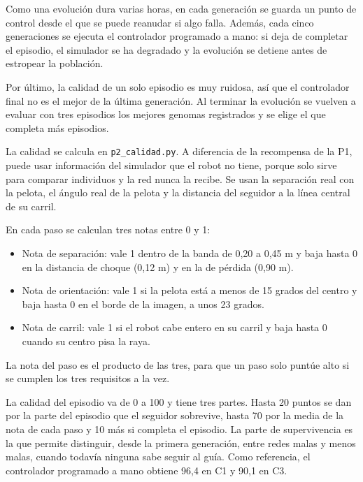 \documentclass[11pt,a4paper]{article}
\makeatletter
\newcommand{\code}[1]{\texttt{#1}}
\renewcommand\section{\@startsection{section}{1}{\z@}{-2ex plus -0.5ex}{1ex}{\normalfont\large\bfseries}}
\makeatother
\begin{document}
Como una evolución dura varias horas, en cada generación se guarda un punto de control desde el que se puede
reanudar si algo falla. Además, cada cinco generaciones se ejecuta el controlador programado a mano: si deja de
completar el episodio, el simulador se ha degradado y la evolución se detiene antes de estropear la población.

Por último, la calidad de un solo episodio es muy ruidosa, así que el controlador final no es el mejor de la
última generación. Al terminar la evolución se vuelven a evaluar con tres episodios los mejores genomas
registrados y se elige el que completa más episodios.

\section{Función de calidad}\label{sec:calidad}

La calidad se calcula en \code{p2\_calidad.py}. A diferencia de la recompensa de la P1, puede usar información
del simulador que el robot no tiene, porque solo sirve para comparar individuos y la red nunca la recibe. Se
usan la separación real con la pelota, el ángulo real de la pelota y la distancia del seguidor a la línea
central de su carril.

En cada paso se calculan tres notas entre 0 y 1:
\begin{itemize}
  \item Nota de separación: vale 1 dentro de la banda de 0,20 a 0,45 m y baja hasta 0 en la distancia de choque
        (0,12 m) y en la de pérdida (0,90 m).
  \item Nota de orientación: vale 1 si la pelota está a menos de 15 grados del centro y baja hasta 0 en el borde
        de la imagen, a unos 23 grados.
  \item Nota de carril: vale 1 si el robot cabe entero en su carril y baja hasta 0 cuando su centro pisa la raya.
\end{itemize}
La nota del paso es el producto de las tres, para que un paso solo puntúe alto si se cumplen los tres requisitos
a la vez.

La calidad del episodio va de 0 a 100 y tiene tres partes. Hasta 20 puntos se dan por la parte del episodio que
el seguidor sobrevive, hasta 70 por la media de la nota de cada paso y 10 más si completa el episodio. La parte
de supervivencia es la que permite distinguir, desde la primera generación, entre redes malas y menos malas,
cuando todavía ninguna sabe seguir al guía. Como referencia, el controlador programado a mano obtiene 96,4 en
C1 y 90,1 en C3.
\end{document}

